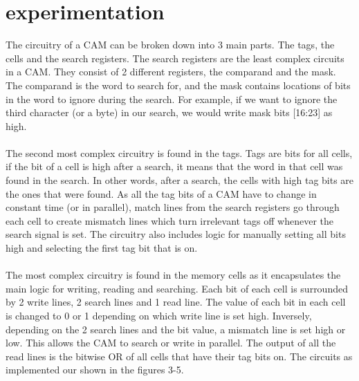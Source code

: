 \section{experimentation}
The circuitry of a CAM can be broken down into 3 main parts. The tags, the cells and the search registers. 
The search registers are the least complex circuits in a CAM. They consist of 2 different registers, the comparand and the mask. 
The comparand is the word to search for, and the mask contains locations of bits in the word to ignore during the search.
For example, if we want to ignore the third character (or a byte) in our search, we would write mask bits [16:23] as high.
\\\\

The second most complex circuitry is found in the tags.
Tags are bits for all cells, if the bit of a cell is high after a search, it means that the word in that cell was found in the search. 
In other words, after a search, the cells with high tag bits are the ones that were found. 
As all the tag bits of a CAM have to change in constant time (or in parallel), match lines from the search registers go through each cell to create mismatch lines which turn irrelevant tags off whenever the search signal is set.
The circuitry also includes logic for manually setting all bits high and selecting the first tag bit that is on.
\\\\
The most complex circuitry is found in the memory cells as it encapsulates the main logic for writing, reading and searching. 
Each bit of each cell is surrounded by 2 write lines, 2 search lines and 1 read line. 
The value of each bit in each cell is changed to 0 or 1 depending on which write line is set high. 
Inversely, depending on the 2 search lines and the bit value, a mismatch line is set high or low. 
This allows the CAM to search or write in parallel. 
The output of all the read lines is the bitwise OR of all cells that have their tag bits on. 
The circuits as implemented our shown in the figures 3-5. 
